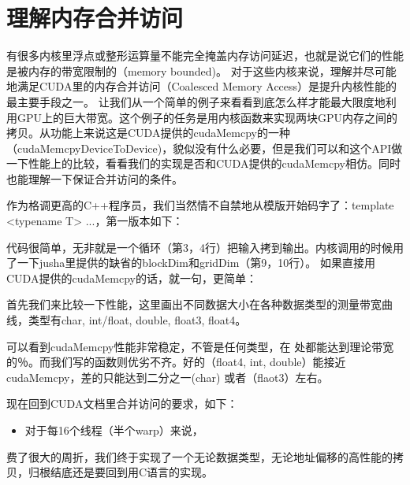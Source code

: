 
\chapter{理解内存合并访问}

有很多内核里浮点或整形运算量不能完全掩盖内存访问延迟，也就是说它们的性能是被内存的带宽限制的（memory bounded)。 对于这些内核来说，理解并尽可能地满足CUDA里的内存合并访问（Coalesced Memory Access）是提升内核性能的最主要手段之一。 让我们从一个简单的例子来看看到底怎么样才能最大限度地利用GPU上的巨大带宽。这个例子的任务是用内核函数来实现两块GPU内存之间的拷贝。从功能上来说这是CUDA提供的cudaMemcpy的一种（cudaMemcpyDeviceToDevice)，貌似没有什么必要，但是我们可以和这个API做一下性能上的比较，看看我们的实现是否和CUDA提供的cudaMemcpy相仿。同时也能理解一下保证合并访问的条件。

作为格调更高的C++程序员，我们当然情不自禁地从模版开始码字了：template <typename T> ...，第一版本如下：
\myvspace

代码很简单，无非就是一个循环（第3，4行）把输入拷到输出。内核调用的时候用了一下jusha里提供的缺省的blockDim和gridDim（第9，10行）。
如果直接用CUDA提供的cudaMemcpy的话，就一句，更简单：
\myvspace


首先我们来比较一下性能，这里画出不同数据大小在各种数据类型的测量带宽曲线，类型有char, int/float, double, float3, float4。

可以看到cudaMemcpy性能非常稳定，不管是任何类型，在  处都能达到理论带宽的％。而我们写的函数则优劣不齐。好的（float4, int, double）能接近cudaMemcpy，差的只能达到二分之一(char) 或者（flaot3）左右。

现在回到CUDA文档里合并访问的要求，如下：
\begin{itemize}
\item 对于每16个线程（半个warp）来说，
\end{itemize}

费了很大的周折，我们终于实现了一个无论数据类型，无论地址偏移的高性能的拷贝，归根结底还是要回到用C语言的实现。